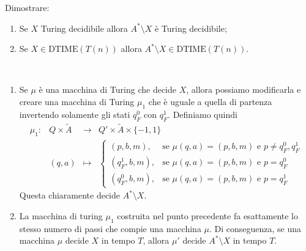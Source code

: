 \begin{ex}
    Dimostrare:

\begin{enumerate}
    \item Se $X$ Turing decidibile allora $A^* \setminus X$ è Turing decidibile;
    \item Se $X \in \mathrm{DTIME}(T(n))$ allora $A^* \setminus X \in \mathrm{DTIME}(T(n))$.
\end{enumerate}
\end{ex}
\begin{sol}\
    \begin{enumerate}
        \item Se $\mu$ è una macchina di Turing
        che decide $X$, allora possiamo modificarla e creare
        una macchina di Turing $\mu_1$ che è uguale a quella di partenza
        invertendo solamente gli stati $q_F^0$ con $q_F^1$.
        Definiamo quindi
        \[
        \begin{matrix}
            \mu_1 : & Q \times \tilde A 
            & \to & Q' \times \tilde A \times \{-1,1 \}
             \\ & 
            (q,a)
            &
            \mapsto 
            &
            \begin{cases}
                (p,b,m), & \text{se } \mu(q,a)=(p,b,m) \text{ e } p\neq q_F^0,q_F^1
                \\
                (q^1_F,b,m), & \text{se } \mu(q,a)=(p,b,m) \text{ e } p= q_F^0
                \\
                (q^0_F,b,m), & \text{se } \mu(q,a)=(p,b,m) \text{ e } p= q_F^1
            \end{cases}
        \end{matrix}
        \]
        Questa chiaramente decide $A^*\setminus X$.
        \item La macchina di turing $\mu_1$ costruita
        nel punto precedente fa esattamente lo stesso numero di passi
        che compie una macchina $\mu$.
        Di conseguenza, se
        una macchina
        $\mu$ decide $X$ in tempo $T$, allora $\mu'$
        decide $A^*\setminus X$ in tempo $T$.
    \end{enumerate}
\end{sol}

\newpage

